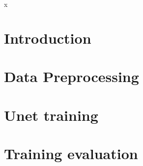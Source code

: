 \documentclass[twoside,12pt]{report}
\begin{document}



\newpage
\thispagestyle{empty}\null\newpage



x
\tableofcontents

\thispagestyle{empty}\null\newpage

\chapter{Introduction}

\chapter{Data Preprocessing}

\chapter{Unet training}

\chapter{Training evaluation}

% 
\end{document}
